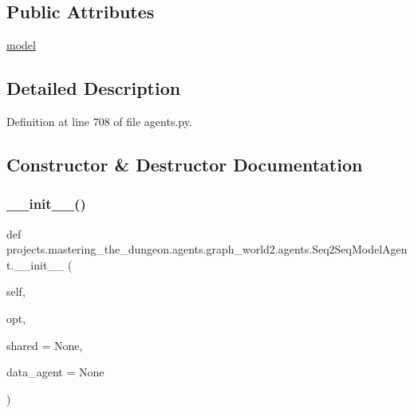 \subsection*{Public Attributes}
\begin{DoxyCompactItemize}
\item 
\hyperlink{classprojects_1_1mastering__the__dungeon_1_1agents_1_1graph__world2_1_1agents_1_1Seq2SeqModelAgent_a97c080f3159cacb53bf3bd35109029d6}{model}
\end{DoxyCompactItemize}


\subsection{Detailed Description}


Definition at line 708 of file agents.\+py.



\subsection{Constructor \& Destructor Documentation}
\mbox{\label{classprojects_1_1mastering__the__dungeon_1_1agents_1_1graph__world2_1_1agents_1_1Seq2SeqModelAgent_a355995e11c4f10e710dab06afa743373}} 
\subsubsection{\texorpdfstring{\+\_\+\+\_\+init\+\_\+\+\_\+()}{\_\_init\_\_()}}
{\footnotesize\ttfamily def projects.\+mastering\+\_\+the\+\_\+dungeon.\+agents.\+graph\+\_\+world2.\+agents.\+Seq2\+Seq\+Model\+Agent.\+\_\+\+\_\+init\+\_\+\+\_\+ (\begin{DoxyParamCaption}\item[{}]{self,  }\item[{}]{opt,  }\item[{}]{shared = {\ttfamily None},  }\item[{}]{data\+\_\+agent = {\ttfamily None} }\end{DoxyParamCaption})}




